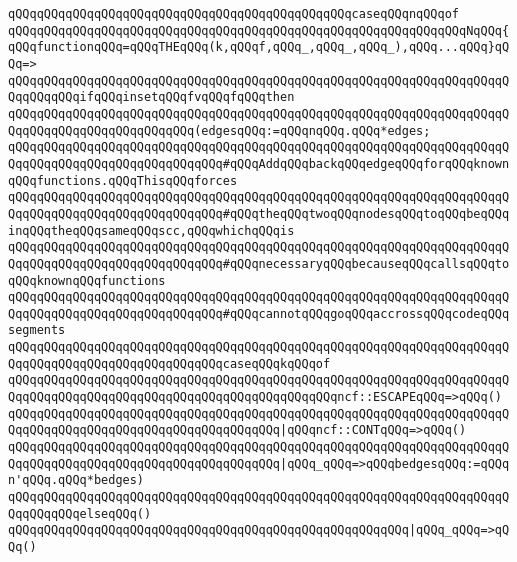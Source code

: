 \verb|qQQqqQQqqQQqqQQqqQQqqQQqqQQqqQQqqQQqqQQqqQQqqQQqcaseqQQqnqQQqof|\newline
\verb|qQQqqQQqqQQqqQQqqQQqqQQqqQQqqQQqqQQqqQQqqQQqqQQqqQQqqQQqqQQqqQQqNqQQq{qQQqfunctionqQQq=qQQqTHEqQQq(k,qQQqf,qQQq_,qQQq_,qQQq_),qQQq...qQQq}qQQq=>|\newline
\verb|qQQqqQQqqQQqqQQqqQQqqQQqqQQqqQQqqQQqqQQqqQQqqQQqqQQqqQQqqQQqqQQqqQQqqQQqqQQqqQQqifqQQqinsetqQQqfvqQQqfqQQqthen|\newline
\verb|qQQqqQQqqQQqqQQqqQQqqQQqqQQqqQQqqQQqqQQqqQQqqQQqqQQqqQQqqQQqqQQqqQQqqQQqqQQqqQQqqQQqqQQqqQQqqQQq(edgesqQQq:=qQQqnqQQq.qQQq*edges;|\newline
\verb|qQQqqQQqqQQqqQQqqQQqqQQqqQQqqQQqqQQqqQQqqQQqqQQqqQQqqQQqqQQqqQQqqQQqqQQqqQQqqQQqqQQqqQQqqQQqqQQqqQQq#qQQqAddqQQqbackqQQqedgeqQQqforqQQqknownqQQqfunctions.qQQqThisqQQqforces|\newline
\verb|qQQqqQQqqQQqqQQqqQQqqQQqqQQqqQQqqQQqqQQqqQQqqQQqqQQqqQQqqQQqqQQqqQQqqQQqqQQqqQQqqQQqqQQqqQQqqQQqqQQq#qQQqtheqQQqtwoqQQqnodesqQQqtoqQQqbeqQQqinqQQqtheqQQqsameqQQqscc,qQQqwhichqQQqis|\newline
\verb|qQQqqQQqqQQqqQQqqQQqqQQqqQQqqQQqqQQqqQQqqQQqqQQqqQQqqQQqqQQqqQQqqQQqqQQqqQQqqQQqqQQqqQQqqQQqqQQqqQQq#qQQqnecessaryqQQqbecauseqQQqcallsqQQqtoqQQqknownqQQqfunctions|\newline
\verb|qQQqqQQqqQQqqQQqqQQqqQQqqQQqqQQqqQQqqQQqqQQqqQQqqQQqqQQqqQQqqQQqqQQqqQQqqQQqqQQqqQQqqQQqqQQqqQQqqQQq#qQQqcannotqQQqgoqQQqaccrossqQQqcodeqQQqsegments|\newline
\verb|qQQqqQQqqQQqqQQqqQQqqQQqqQQqqQQqqQQqqQQqqQQqqQQqqQQqqQQqqQQqqQQqqQQqqQQqqQQqqQQqqQQqqQQqqQQqqQQqqQQqcaseqQQqkqQQqof|\newline
\verb|qQQqqQQqqQQqqQQqqQQqqQQqqQQqqQQqqQQqqQQqqQQqqQQqqQQqqQQqqQQqqQQqqQQqqQQqqQQqqQQqqQQqqQQqqQQqqQQqqQQqqQQqqQQqqQQqqQQqncf::ESCAPEqQQq=>qQQq()|\newline
\verb|qQQqqQQqqQQqqQQqqQQqqQQqqQQqqQQqqQQqqQQqqQQqqQQqqQQqqQQqqQQqqQQqqQQqqQQqqQQqqQQqqQQqqQQqqQQqqQQqqQQqqQQqqQQq|\verb#|qQQqncf::CONTqQQq=>qQQq()#\newline
\verb|qQQqqQQqqQQqqQQqqQQqqQQqqQQqqQQqqQQqqQQqqQQqqQQqqQQqqQQqqQQqqQQqqQQqqQQqqQQqqQQqqQQqqQQqqQQqqQQqqQQqqQQqqQQq|\verb#|qQQq_qQQq=>qQQqbedgesqQQq:=qQQqn'qQQq.qQQq*bedges)#\newline
\verb|qQQqqQQqqQQqqQQqqQQqqQQqqQQqqQQqqQQqqQQqqQQqqQQqqQQqqQQqqQQqqQQqqQQqqQQqqQQqqQQqelseqQQq()|\newline
\verb|qQQqqQQqqQQqqQQqqQQqqQQqqQQqqQQqqQQqqQQqqQQqqQQqqQQqqQQq|\verb#|qQQq_qQQq=>qQQq()#\newline
